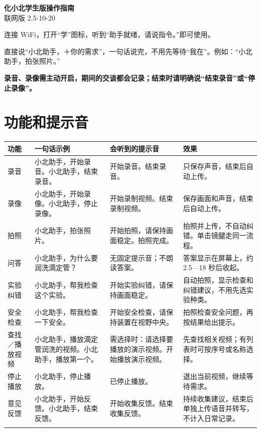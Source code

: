 \documentclass[UTF8,a4paper,10pt]{ctexart}
\begin{document}
\begin{center}
{\LARGE\bfseries 化小北学生版操作指南}\\[3pt]
{\footnotesize 联网版 2.5-10-20}
\end{center}
连接 WiFi，打开“学”图标，听到“助手就绪，请说指令。”即可使用。

直接说“小北助手，＋你的需求”，一句话说完，不用先等待“我在”。例如：“小北助手，拍张照片。”

\textbf{录音、录像需主动开启，期间的交谈都会记录；结束时请明确说“结束录音”或“停止录像”。}

\section{功能和提示音}
{\footnotesize
\begin{tabularx}{\linewidth}{@{}p{1.35cm}p{5.0cm}p{4.65cm}Y@{}}
\toprule
\textbf{功能} & \textbf{一句话示例} & \textbf{会听到的提示音} & \textbf{效果} \\
\midrule
录音 & 小北助手，开始录音。\newline 小北助手，结束录音。 & 开始录音。\newline 结束录音。 & 只保存声音，结束后自动上传。 \\ \addlinespace[3pt]
录像 & 小北助手，开始录像。\newline 小北助手，停止录像。 & 开始录制视频。\newline 结束录制视频。 & 保存画面和声音，结束后自动上传。 \\ \addlinespace[3pt]
拍照 & 小北助手，拍张照片。 & 开始拍照，请保持画面稳定。\newline 拍照完成。 & 拍照并上传，不自动纠错。单击镜腿走同一流程。 \\ \addlinespace[3pt]
问答 & 小北助手，为什么要润洗滴定管？ & 无固定提示音；不朗读答案。 & 答案显示在屏幕上，约 2.5—18 秒后收起。 \\ \addlinespace[3pt]
实验纠错 & 小北助手，帮我检查这个实验。 & 开始实验纠错，请保持画面稳定。 & 自动拍照，显示检查和纠错建议，不用先选实验种类。 \\ \addlinespace[3pt]
安全检查 & 小北助手，帮我检查一下安全。 & 开始安全检查，请保持装置在视野中央。 & 拍照检查安全问题，再按结果给出提示。 \\ \addlinespace[3pt]
查找／播放视频 & 小北助手，播放滴定管润洗的视频。\newline 小北助手，播放第一个。 & 需选择时：请选择要播放的演示视频。\newline 开始播放演示视频。 & 先查找相关视频；有列表时可按序号或名称选择。 \\ \addlinespace[3pt]
停止播放 & 小北助手，停止播放。 & 已停止播放。 & 退出当前视频，继续等待需求。 \\ \addlinespace[3pt]
意见反馈 & 小北助手，开始反馈。\newline 小北助手，结束反馈。 & 开始收集反馈。\newline 结束收集反馈。 & 持续收集建议，结束后单独上传语音并转写，不计入日常记录。 \\ \addlinespace[3pt]
\bottomrule
\end{tabularx}
}
\end{document}
